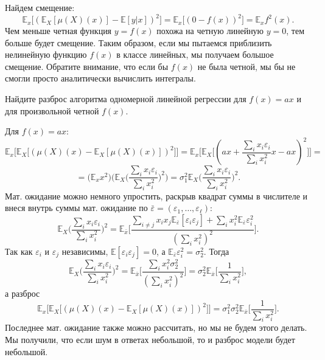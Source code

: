 \documentclass[12pt,fleqn]{article}
\begin{document}
\begin{esSolution}
    	Найдем смещение:
    	\[
    	\mathbb{E}_{x}\bigl[(\mathbb{E}_{X}[\mu(X)(x)] - \mathbb{E}[y|x] )^2\bigr] = \mathbb{E}_{x}\bigl[(0 -  f(x))^2\bigr] = 
    	\mathbb{E}_x f^2(x).
    	\]
    	Чем меньше четная функция $y=f(x)$ похожа на четную линейную $y = 0$, тем больше будет смещение. Таким образом, если мы пытаемся приблизить нелинейную функцию $f(x)$ в классе линейных, мы получаем большое смещение. Обратите внимание, что если бы $f(x)$ не была четной, мы бы не смогли просто аналитически вычислить интегралы.
    	
    \end{esSolution}
    \begin{vkProblem}
    	Найдите разброс алгоритма одномерной линейной регрессии для $f(x) = ax$ и для произвольной четной $f(x)$. 
    \end{vkProblem}
    \begin{esSolution}
    	Для $f(x) = ax:$
    	\[
    	\mathbb{E}_{x}\bigl[\mathbb{E}_{X}\bigl[(\mu(X)(x) - \mathbb{E}_{X}[\mu(X)(x)] )^2\bigr]\bigr] = 
    	\mathbb{E}_{x}\bigl[\mathbb{E}_{X}\bigl[(
    	a x +  \frac{\sum_i x_i \varepsilon_i}{\sum_i x_i^2} x - ax
    	 )^2\bigr]\bigr] =
    	 \]
    	 \[ =\biggl( \mathbb{E}_{x} x^2 \biggr) 
    	 \biggl (\mathbb{E}_{X}\biggl(
    	 \frac{\sum_i x_i \varepsilon_i}{\sum_i x_i^2} 
    	\biggr )^2\biggr) = \sigma_1^2
    	\mathbb{E}_{X}
    	\biggl (\frac{\sum_i x_i \varepsilon_i}{\sum_i x_i^2} \biggr)
    	^2.
    	\]
    	Мат. ожидание можно немного упростить, раскрыв квадрат суммы в числителе и внеся внутрь суммы мат. ожидание по $\bar \varepsilon = (\varepsilon_1, \dots, \varepsilon_\ell)$:
    	\[
    	\mathbb{E}_{X}\biggl(
    	\frac{\sum_i x_i \varepsilon_i}{\sum_i x_i^2} 
    	\biggr )^2 = \mathbb{E}_{\bar x} \biggl[ \frac {\sum_{i \ne j} x_i x_j \mathbb{E}_{\bar \varepsilon } [\varepsilon_i \varepsilon_j] +
    		\sum_i x_i^2 \mathbb{E}_{\bar \varepsilon } \varepsilon_i^2 } {(\sum_i x_i^2)^2} 
    	 \biggr].
    	\]
    	Так как $\varepsilon_i$ и $\varepsilon_j$ независимы, $\mathbb{E}[\varepsilon_i \varepsilon_j] = 0$, а $\mathbb{E}_{\bar \varepsilon } \varepsilon_i^2 = \sigma_2^2$. Тогда
    	\[
    	\mathbb{E}_{X}\biggl(
    	\frac{\sum_i x_i \varepsilon_i}{\sum_i x_i^2} 
    	\biggr )^2 = \mathbb{E}_{\bar x} \biggl[ \frac {
    		\sum_i x_i^2 \sigma_2^2} {(\sum_i x_i^2)^2} 
    	\biggr] = \sigma_2^2 \mathbb{E}_{\bar x} \biggl[ \frac 1 {\sum_i x_i^2} \biggr],
    	\]
    	а разброс
    	\[
    	\mathbb{E}_{x}\bigl[\mathbb{E}_{X}\bigl[(\mu(X)(x) - \mathbb{E}_{X}[\mu(X)(x)] )^2\bigr]\bigr] = 
    	 \sigma_1^2 \sigma_2^2
    	\mathbb{E}_{\bar x} \biggl[ \frac 1 {\sum_i x_i^2} \biggr].
    	\]
    	Последнее мат. ожидание также можно рассчитать, но мы не будем этого делать. Мы получили, что если шум в ответах небольшой, то и разброс модели будет небольшой. 
    	

\end{esSolution}
\end{document}
